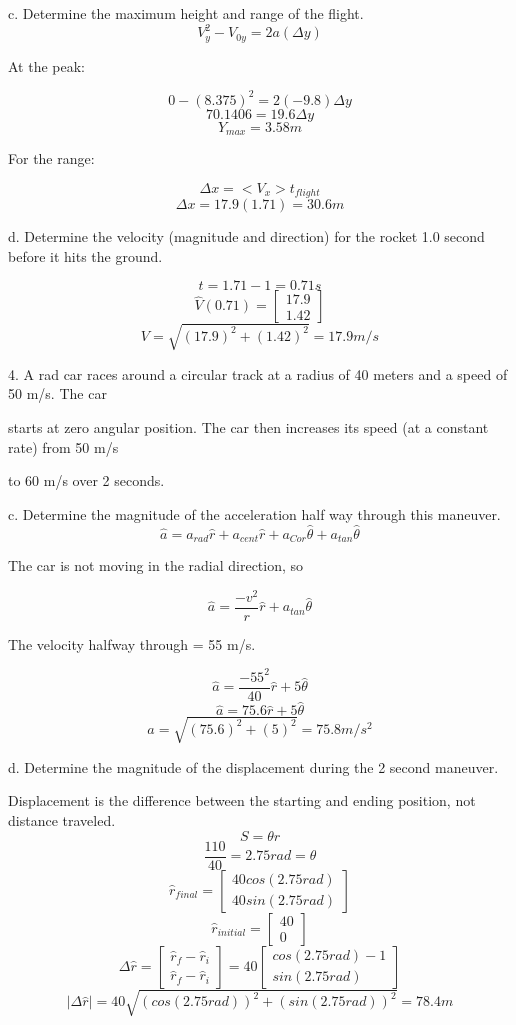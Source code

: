 \documentclass{article}
\begin{document}
c. Determine the maximum height and range of the flight.
\[V_y^2 - V_{0y} = 2a(\Delta y)\]
\begin{center} At the peak: \end{center}
\[ 0 - (8.375)^2 = 2(-9.8) \Delta y \]
\[ 70.1406 = 19.6 \Delta y\]
\[ Y_{max}= 3.58 m\]
\begin{center} For the range: \end{center}
\[\Delta x = <V_x> t_{flight}\]
\[\Delta x = 17.9(1.71) = 30.6m\]

d. Determine the velocity (magnitude and direction) for the rocket 1.0 second before it hits the ground.

\[t = 1.71-1 = 0.71s\]
\[\hat{V}(0.71) = \begin{bmatrix} 17.9 \\ 1.42 \end{bmatrix}\]
\[V = \sqrt{(17.9)^2 + (1.42)^2} = 17.9 m/s\]

4.  A rad car races around a circular track at a radius of 40 meters and a speed of 50 m/s. The car \par starts at zero angular position. The car then increases its speed (at a constant rate) from 50 m/s \par to 60 m/s over 2 seconds.

c. Determine the magnitude of the acceleration half way through this maneuver. 
\[\hat{a} = a_{rad} \hat{r} + a_{cent} \hat{r} + a_{Cor} \hat{\theta} + a_{tan} \hat{\theta}\]
\begin{center} The car is not moving in the radial direction, so \end{center}
\[\hat{a} = \frac{-v^2}{r} \hat{r} + a_{tan} \hat{\theta}\]
\begin{center} The velocity halfway through  = 55 m/s. \end{center}
\[\hat{a} = \frac{-55^2}{40} \hat{r} + 5 \hat{\theta} \]
\[\hat{a} = 75.6 \hat{r} + 5\hat{\theta}\]
\[a= \sqrt{(75.6)^2 + (5)^2} = 75.8 m/s^2\]

d. Determine the magnitude of the displacement during the 2 second maneuver. 
\par Displacement is the difference between the starting and ending position, not distance traveled. 
\[S = \theta r\]
\[\frac{110}{40} = 2.75 rad = \theta \]
\[\hat{r}_{final} = \begin{bmatrix} 40 cos(2.75 rad) \\ 40 sin(2.75 rad) \end{bmatrix}\]
\[\hat{r}_{initial} = \begin{bmatrix} 40 \\ 0 \end{bmatrix}\]
\[\Delta \hat{r} = \begin{bmatrix} \hat{r}_f - \hat{r}_i \\ \hat{r}_f - \hat{r}_i \end{bmatrix} = 40 \begin{bmatrix} cos(2.75 rad) -1 \\ sin(2.75 rad) \end{bmatrix}\]
\[ |\Delta \hat{r}|  = 40\sqrt{(cos(2.75 rad))^2 + (sin(2.75 rad))^2} = 78.4 m \]
\end{document}
